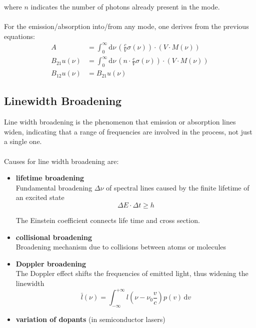 \documentclass{article}
\newcommand{\diff}{\mathrm{d}}
\newcommand{\lr}[1]{\left(#1\right)}
\begin{document}
where $n$ indicates the number of photons already present in the mode.\\
\\
For the emission/absorption into/from any mode, one derives from the previous equations:
	\begin{align*}
		A &= \int_0^\infty \diff\nu \, \lr{ \frac{c}{V} \sigma(\nu) } \cdot \lr{ V \cdot M(\nu) } \\
		B_{21} u(\nu) &= \int_0^\infty \diff\nu \, \lr{ n \cdot \frac{c}{V} \sigma(\nu) } \cdot \lr{ V \cdot M(\nu) }\\
		B_{12} u(\nu) &= B_{21} u(\nu)
	\end{align*}


\newpage


\subsection{Linewidth Broadening}
Line width broadening is the phenomenon that emission or absorption lines widen, indicating that a range of frequencies are involved in the process, not just a single one.\\
\\
Causes for line width broadening are:
	\begin{itemize}
		\item \textbf{lifetime broadening}\\
		Fundamental broadening $\Delta\nu$ of spectral lines caused by the finite lifetime of an excited state
			\begin{equation}
				\Delta E \cdot \Delta t \geq h
			\end{equation}

		{\color{violet}The Einstein coefficient connects life time and cross section.}


		\item \textbf{collisional broadening}\\
		Broadening mechanism due to collisions between atoms or molecules


		\item \textbf{Doppler broadening}\\
		The Doppler effect shifts the frequencies of emitted light, thus widening the linewidth
			\begin{equation}
				\bar{l}(\nu) = \int_{-\infty}^{+\infty} l\lr{ \nu - \nu_0\frac{v}{c} } p(v) \, \diff v
			\end{equation}
			
		
		\item \textbf{variation of dopants} (in semiconductor lasers)
	\end{itemize}
\end{document}
